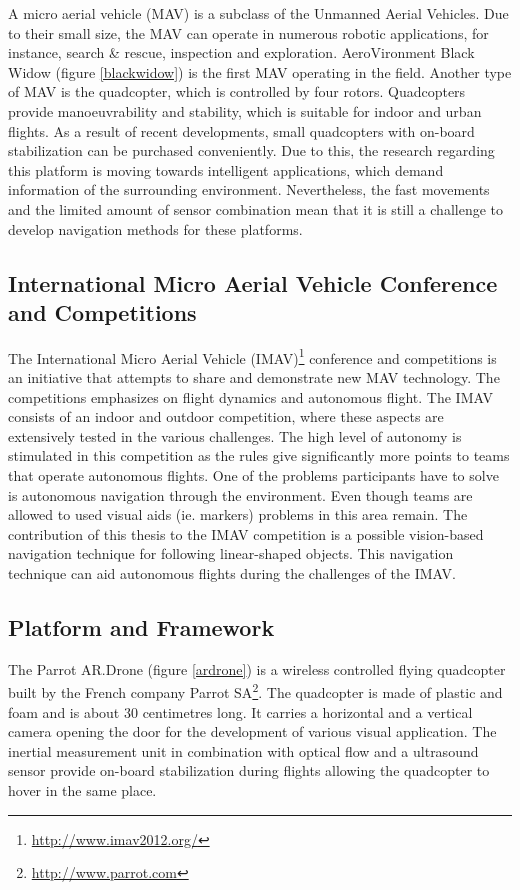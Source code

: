 \documentclass[a4paper]{article}
\begin{document}
A micro aerial vehicle (MAV) is a subclass of the Unmanned Aerial Vehicles. Due to their small size, the MAV can operate in numerous robotic applications, for instance, search \&  rescue, inspection and exploration. AeroVironment Black Widow\cite{Grasmeyer2001} (figure \ref{blackwidow}) is the first MAV operating in the field. Another type of MAV is the quadcopter, which is controlled by four rotors. Quadcopters provide manoeuvrability and stability, which is suitable for indoor and urban flights. As a result of recent developments, small quadcopters with on-board stabilization can be purchased conveniently. Due to this, the research regarding this platform is moving towards intelligent applications, which demand information of the surrounding environment. Nevertheless, the fast movements and the limited amount of sensor combination mean that it is still a challenge to develop navigation methods for these platforms.

\subsection{International Micro Aerial Vehicle Conference and Competitions}
The International Micro Aerial Vehicle (IMAV)\footnote{\url{http://www.imav2012.org/}} conference and competitions is an initiative that attempts to share and demonstrate new MAV technology. The competitions emphasizes on flight dynamics and autonomous flight. The IMAV consists of an indoor and outdoor competition, where these aspects are extensively tested in the various challenges. The high level of autonomy is stimulated in this competition as the rules give significantly more points to teams that operate autonomous flights. One of the problems participants have to solve is autonomous navigation through the environment. Even though teams are allowed to used visual aids (ie. markers) problems in this area remain. The contribution of this thesis to the IMAV competition is a possible vision-based navigation technique for following linear-shaped objects. This navigation technique can aid autonomous flights during the challenges of the IMAV.

\subsection{Platform and Framework}
The Parrot AR.Drone (figure \ref{ardrone}) is a wireless controlled flying quadcopter built by the French company Parrot SA\footnote{\url{http://www.parrot.com}}. The quadcopter is made of plastic and foam and is about 30 centimetres long. It carries a horizontal and a vertical camera opening the door for the development of various visual application. The inertial measurement unit in combination with optical flow and a ultrasound sensor provide on-board stabilization during flights allowing the quadcopter to hover in the same place. 
\end{document}
